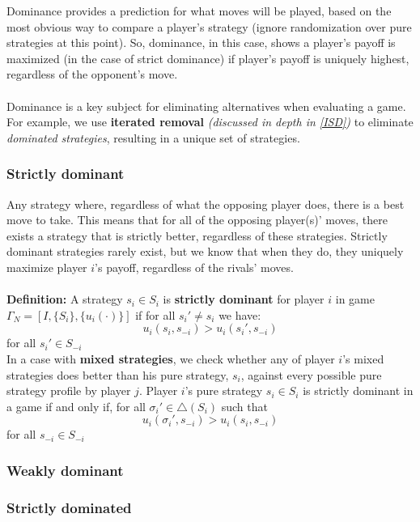 \documentclass{article}
\begin{document}
\noindent Dominance provides a prediction for what moves will be played, based on the most obvious way to compare a player's strategy (ignore randomization over pure strategies at this point). So, dominance, in this case, shows a player's payoff is maximized (in the case of strict dominance) if player's payoff is uniquely highest, regardless of the opponent's move. \\ 
\\
Dominance is a key subject for eliminating alternatives when evaluating a game. For example, we use \textbf{iterated removal} \textit{(discussed in depth in \ref{ISD})} to eliminate \textit{dominated strategies}, resulting in a unique set of strategies. \\

\subsubsection{Strictly dominant}
Any strategy where, regardless of what the opposing player does, there is a best move to take. This means that for all of the opposing player(s)' moves, there exists a strategy that is strictly better, regardless of these strategies. Strictly dominant strategies rarely exist, but we know that when they do, they uniquely maximize player $i$'s payoff, regardless of the rivals' moves. \\
\\
\noindent \textbf{Definition:} A strategy $s_i \in S_i$ is \textbf{strictly dominant} for player $i$ in game $\Gamma_N = [I, \{S_i\}, \{u_{i}(\cdot)\}]$ if for all $s_{i}' \neq s_i$ we have: \[
u_{i}(s_{i}, s_{-i}) > u_{i}(s_{i}', s_{-i})
\] 
for all $s_{i}' \in S_{-i}$ \\

\noindent In a case with \textbf{mixed strategies}, we check whether any of player $i$'s mixed strategies does better than his pure strategy, $s_i$, against every possible pure strategy profile by player $j$. Player $i$'s pure strategy $s_i \in S_i$ is strictly dominant in a game if and only if, for all $\sigma_{i}' \in \triangle(S_i)$ such that \[
u_{i}(\sigma_{i}', s_{-i}) > u_{i}(s_{i}, s_{-i})
\]
for all $s_{-i} \in S_{-i}$
 
\subsubsection{Weakly dominant}

\subsubsection{Strictly dominated}
\end{document}
